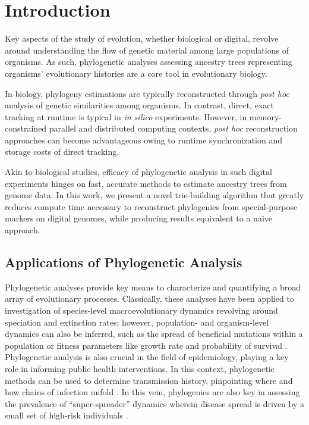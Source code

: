 \section{Introduction} \label{sec:introduction}

Key aspects of the study of evolution, whether biological or digital, revolve around understanding the flow of genetic material among large populations of organisms.
As such, phylogenetic analyses assessing ancestry trees representing organisms' evolutionary histories are a core tool in evolutionary biology.

In biology, phylogeny estimations are typically reconstructed through \textit{post hoc} analysis of genetic similarities among organisms.
In contrast, direct, exact tracking at runtime is typical in \textit{in silico} experiments.
However, in memory-constrained parallel and distributed computing contexts, \textit{post hoc} reconstruction approaches can become advantageous owing to runtime synchronization and storage costs of direct tracking.

Akin to biological studies, efficacy of phylogenetic analysis in such digital experiments hinges on fast, accurate methods to estimate ancestry trees from genome data.
In this work, we present a novel trie-building algorithm that greatly reduces compute time necessary to reconstruct phylogenies from special-purpose markers on digital genomes, while producing results equivalent to a naive approach.

\subsection{Applications of Phylogenetic Analysis}

Phylogenetic analyses provide key means to characterize and quantifying a broad array of evolutionary processes.
Classically, these analyses have been applied to investigation of species-level macroevolutionary dynamics revolving around speciation and extinction rates; however, population- and organism-level dynamics can also be inferred, such as the spread of beneficial mutations within a population or fitness parameters like growth rate and probability of survival \citep{genthon2023cell, levy2015quantitative, stadler2013recovering}.
Phylogenetic analysis is also crucial in the field of epidemiology, playing a key role in informing public health interventions.
In this context, phylogenetic methods can be used to determine transmission history, pinpointing where and how chains of infection unfold \citep{wang2020role}.
In this vein, phylogenies are also key in assessing the prevalence of  ``super-spreader'' dynamics wherein disease spread is driven by a small set of high-risk individuals \citep{colijn2014phylogenetic}.

